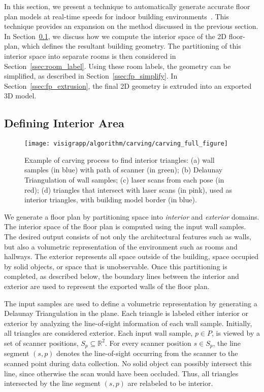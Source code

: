 \documentclass[12pt,onecolumn,oneside]{book}
\begin{document}
In this section, we present a technique to automatically generate accurate floor plan models at real-time speeds for indoor building environments~\cite{Turner14}.  This technique provides an expansion on the method discussed in the previous section.  In Section~\ref{ssec:visigrapp_carving}, we discuss how we compute the interior space of the 2D floor-plan, which defines the resultant building geometry.  The partitioning of this interior space into separate rooms is then considered in Section~\ref{ssec:room_label}.  Using these room labels, the geometry can be simplified, as described in Section~\ref{ssec:fp_simplify}.  In Section~\ref{ssec:fp_extrusion}, the final 2D geometry is extruded into an exported 3D model.

\subsection{Defining Interior Area}
\label{ssec:visigrapp_carving}

\begin{figure}[t]
  \centering
  \texttt{[image: visigrapp/algorithm/carving/carving\_full\_figure]}
  \caption[Carving process to find interior triangles.]{Example of carving process to find interior triangles:  (a) wall samples (in blue) with path of scanner (in green); (b) Delaunay Triangulation of wall samples; (c) laser scans from each pose (in red); (d) triangles that intersect with laser scans (in pink), used as interior triangles, with building model border (in blue).}
  \label{fig:visigrapp_floorplan_creation}
\end{figure}

We generate a floor plan by partitioning space into {\it interior} and {\it exterior} domains.  The interior space of the floor plan is computed using the input wall samples.  The desired output consists of not only the architectural features such as walls, but also a volumetric representation of the environment such as rooms and hallways.  The exterior represents all space outside of the building, space occupied by solid objects, or space that is unobservable.  Once this partitioning is completed, as described below, the boundary lines between the interior and exterior are used to represent the exported walls of the floor plan.

The input samples are used to define a volumetric representation by generating a Delaunay Triangulation in the plane.  Each triangle is labeled either interior or exterior by analyzing the line-of-sight information of each wall sample.  Initially, all triangles are considered exterior.  Each input wall sample, $p \in P$, is viewed by a set of scanner positions, $S_p \subseteq \mathbb{R}^2$.  For every scanner position $s \in S_p$, the line segment $(s,p)$ denotes the line-of-sight occurring from the scanner to the scanned point during data collection.  No solid object can possibly intersect this line, since otherwise the scan would have been occluded.  Thus, all triangles intersected by the line segment $(s,p)$ are relabeled to be interior.
\end{document}
